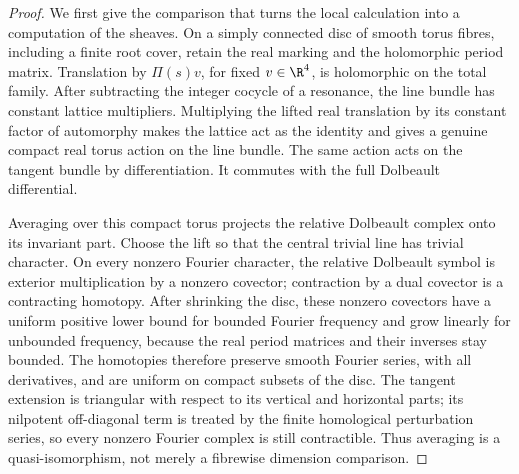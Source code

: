 \begin{proof}
We first give the comparison that turns the local calculation into
a computation of the sheaves. On a simply connected disc of smooth
torus fibres, including a finite root cover, retain the real marking
and the holomorphic period matrix. Translation by $\Pi(s)v$, for
fixed $v\in\R^4$, is holomorphic on the total family. After
subtracting the integer cocycle of a resonance, the line bundle has
constant lattice multipliers. Multiplying the lifted real translation
by its constant factor of automorphy makes the lattice act as the
identity and gives a genuine compact real torus action on the line
bundle. The same action acts on the tangent bundle by differentiation.
It commutes with the full Dolbeault differential.

Averaging over this compact torus projects the relative Dolbeault
complex onto its invariant part. Choose the lift so that the central
trivial line has trivial character. On every nonzero Fourier character,
the relative Dolbeault symbol is exterior multiplication by a
nonzero covector; contraction by a dual covector is a contracting
homotopy. After shrinking the disc, these nonzero covectors have a
uniform positive lower bound for bounded Fourier frequency and grow
linearly for unbounded frequency, because the real period matrices
and their inverses stay bounded. The homotopies therefore preserve
smooth Fourier series, with all derivatives, and are uniform on
compact subsets of the disc. The tangent extension is triangular
with respect to its vertical and horizontal parts; its nilpotent
off-diagonal term is treated by the finite homological perturbation
series, so every nonzero Fourier complex is still contractible.
Thus averaging is a quasi-isomorphism, not merely a fibrewise
dimension comparison.


\end{proof}
